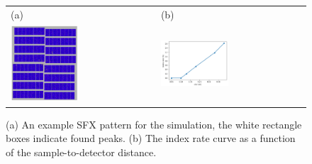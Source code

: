 \documentclass[11pt, a4paper]{article}
\begin{document}
\begin{figure}
\centering
\begin{tabular}{m{3.2in} m{3.2in}}
\LARGE{(a)}     &   \LARGE{(b)}\\
\includegraphics[width=0.48\textwidth]{figures/SFX_pattern.png} &
\includegraphics[width=0.48\textwidth]{figures/optimize_curve.png} 
\end{tabular}
\caption 
{\label{fig:optSim}
(a) An example SFX pattern for the simulation, the white rectangle boxes indicate found peaks. (b) The index rate curve as a function of the sample-to-detector distance.} 
\end{figure}



\end{document}
